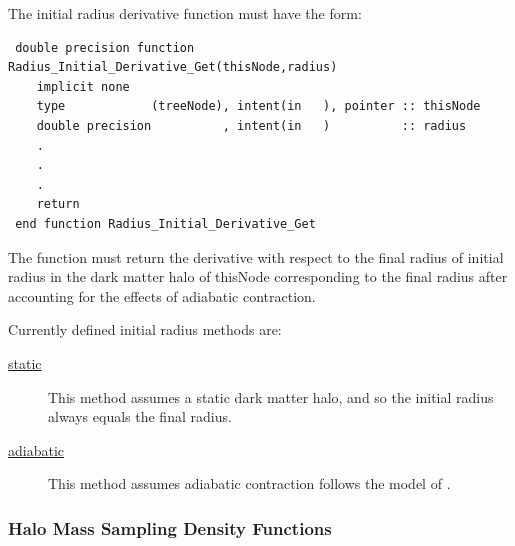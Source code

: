The initial radius derivative function must have the form:
\begin{verbatim}
 double precision function Radius_Initial_Derivative_Get(thisNode,radius)
    implicit none
    type            (treeNode), intent(in   ), pointer :: thisNode
    double precision          , intent(in   )          :: radius
    .
    .
    .
    return
 end function Radius_Initial_Derivative_Get
\end{verbatim}
The function must return the derivative with respect to the final {\normalfont \ttfamily radius} of initial radius in the dark matter halo of {\normalfont \ttfamily thisNode} corresponding to the final {\normalfont \ttfamily radius} after accounting for the effects of adiabatic contraction.

Currently defined initial radius methods are:
\begin{description}
 \item [\hyperlink{galactic_structure.radius_solver.initial_radii.static.F90:galactic_structure_initial_radii_static:galactic_structure_radius_initial_static}{{\normalfont \ttfamily static}}] This method assumes a static dark matter halo, and so the initial radius always equals the final radius.
 \item [\hyperlink{galactic_structure.radius_solver.initial_radii.adiabatic.F90:galactic_structure_initial_radii_adiabatic:galactic_structure_radius_initial_adiabatic}{{\normalfont \ttfamily adiabatic}}] This method assumes adiabatic contraction follows the model of \cite{gnedin_response_2004}.
\end{description}

\subsubsection{Halo Mass Sampling Density Functions}

